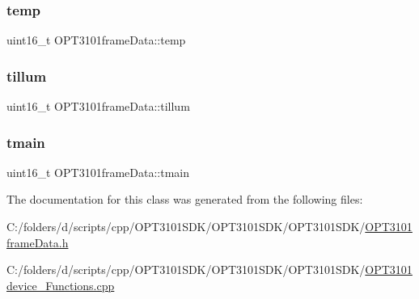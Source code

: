 \subsubsection{\texorpdfstring{temp}{temp}}
{\footnotesize\ttfamily uint16\+\_\+t O\+P\+T3101frame\+Data\+::temp}

\mbox{\label{class_o_p_t3101frame_data_ac4d02a33435290a23b637ee678a93d9e}} 
\subsubsection{\texorpdfstring{tillum}{tillum}}
{\footnotesize\ttfamily uint16\+\_\+t O\+P\+T3101frame\+Data\+::tillum}

\mbox{\label{class_o_p_t3101frame_data_a189413120d1a3cf9c248caaff5f8640a}} 
\subsubsection{\texorpdfstring{tmain}{tmain}}
{\footnotesize\ttfamily uint16\+\_\+t O\+P\+T3101frame\+Data\+::tmain}



The documentation for this class was generated from the following files\+:\begin{DoxyCompactItemize}
\item 
C\+:/folders/d/scripts/cpp/\+O\+P\+T3101\+S\+D\+K/\+O\+P\+T3101\+S\+D\+K/\+O\+P\+T3101\+S\+D\+K/\mbox{\hyperlink{_o_p_t3101frame_data_8h}{O\+P\+T3101frame\+Data.\+h}}\item 
C\+:/folders/d/scripts/cpp/\+O\+P\+T3101\+S\+D\+K/\+O\+P\+T3101\+S\+D\+K/\+O\+P\+T3101\+S\+D\+K/\mbox{\hyperlink{_o_p_t3101device___functions_8cpp}{O\+P\+T3101device\+\_\+\+Functions.\+cpp}}\end{DoxyCompactItemize}
